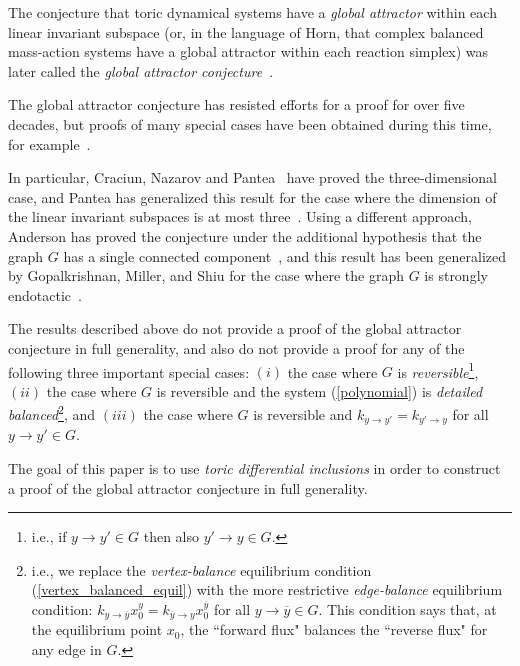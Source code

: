 \documentclass[12pt,letterpaper]{article}
\renewcommand{\bar}{\overline}
\begin{document}
The conjecture that toric dynamical systems have a {\em global attractor} within each linear invariant subspace (or, in the language of Horn, that complex balanced mass-action systems have a global attractor within each reaction simplex) was later called the {\em global attractor conjecture}~\cite{TDS}.
 
The global attractor conjecture has resisted efforts for a proof for over five decades, but proofs of many special cases have been obtained during this time, for example~\cite{siegel_maclean, Sontag1, TDS, Anderson_Shiu_2010, Anderson_2011, sf11, CNP, persistence2}.

In particular, Craciun, Nazarov and Pantea~\cite{CNP} have  proved the three-dimensional case, and Pantea has generalized this result for the case where the dimension of the linear invariant subspaces is at most three~\cite{persistence2}. Using a different approach, Anderson has proved the conjecture under the additional hypothesis that the graph $G$ has a single connected component~\cite{Anderson_2011}, and this result has been generalized by Gopalkrishnan, Miller, and Shiu for the case where the graph $G$ is strongly endotactic~\cite{Gopalkrishnan_Miller_Shiu_2013}.

The results described above do not provide a proof of the global attractor conjecture in full generality, and also do not provide a proof for any of the following three important special cases: $(i)$ the case where $G$ is {\em reversible}\footnote{
i.e., if $y \to y' \in G$ then also $y' \to y \in G$.
}, $(ii)$ the case where $G$ is reversible and the system (\ref{polynomial}) is {\em detailed balanced}\footnote{
i.e., we replace the {\em vertex-balance} equilibrium condition (\ref{vertex_balanced_equil}) with the more restrictive {\em edge-balance} equilibrium condition: $k_{y \to \bar{y}} x_0^y = k_{\bar{y} \to y} x_0^{\bar{y}}$ for all $y \to \bar{y} \in G$. This condition says that, at the equilibrium point $x_0$, the ``forward flux" balances the ``reverse flux" for any edge in $G$.
},  and $(iii)$ the case where $G$ is reversible and $k_{y \to y'} = k_{y' \to y}$ for all $y \to y' \in G$.

\bigskip

The goal of this paper is to use {\em toric differential inclusions} in order to construct a proof of the global attractor conjecture in full generality. 

\bigskip
\end{document}

